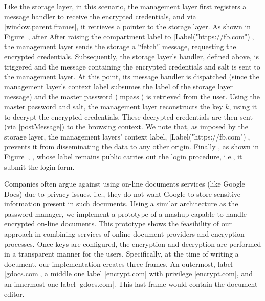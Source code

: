 Like the storage layer, in this scenario, the management layer first
registers a message handler to receive the encrypted credentials, and
via \js|window.parent.frames|, it retrieves a pointer to the storage
layer.
%
\iffigures
\ifcompletefigures
As shown in Figure~, after 
\fi
\else
After
\fi
raising the
compartment label to \js|Label("https://fb.com")|, the management
layer sends the storage a ``fetch'' message, requesting the encrypted
credentials.
%
%
Subsequently, the storage layer's handler, defined above, is triggered
and the message containing the encrypted
credentials and salt is sent to the management layer.
%
At this point, its message handler is dispatched (since the management
layer's context label subsumes the label of the storage layer message)
and the master password (\js|mpass|) is retrieved from the user. 
%
Using the master password and salt, the management layer reconstructs
the key $k$, using it to decrypt the encrypted credentials.
%
These decrypted credentials are then sent (via \js|postMessage|) to
the  browsing context.
%
We note that, as imposed by the storage layer, the management layers'
context label, \js|Label("https://fb.com")|, prevents it from
disseminating the data to any other origin.
%
Finally
\iffigures
\ifcompletefigures
, as shown in Figure~, 
\fi
\fi
{},
whose label remains public carries out the login procedure, i.e., it
submit the login form.

Companies often argue against using on-line documents services (like Google
Docs) due to privacy issues, i.e., they do not want Google to store sensitive
information present in such documents. Using a similar architecture as the
password manager, we implement a prototype of a mashup capable to handle
encrypted on-line documents. This prototype shows the feasibility of our
approach in combining services of online document providers and encryption
processes. Once keys are configured, the encryption and decryption are
performed in a transparent manner for the users. Specifically, at the time of
writing a document, our implementation creates three frames. An outermost,
label \js|gdocs.com|, a middle one label \js|encrypt.com| with privilege
\js|encrypt.com|, and an innermost one label \js|gdocs.com|. This last 
frame would contain the document editor. 

